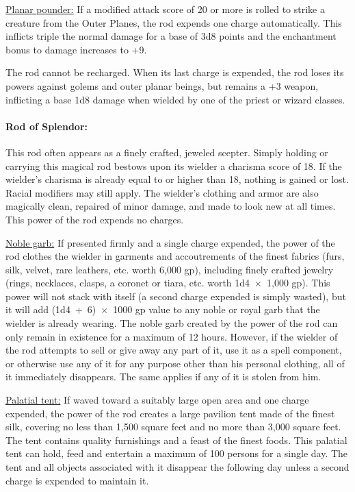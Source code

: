 \begin{multicols}{2}
\underline{Planar pounder:} If a modified attack score of 20 or more is rolled to strike a creature from the Outer Planes, the rod expends one charge automatically.  This inflicts triple the normal damage for a base of 3d8 points and the enchantment bonus to damage increases to +9.

The rod cannot be recharged.  When its last charge is expended, the rod loses its powers against golems and outer planar beings, but remains a +3 weapon, inflicting a base 1d8 damage when wielded by one of the priest or wizard classes.

\paragraph{Rod of Splendor:} This rod often appears as a finely crafted, jeweled scepter.  Simply holding or carrying this magical rod bestows upon its wielder a charisma score of 18.  If the wielder's charisma is already equal to or higher than 18, nothing is gained or lost.  Racial modifiers may still apply.  The wielder's clothing and armor are also magically clean, repaired of minor damage, and made to look new at all times.  This power of the rod expends no charges.  

\underline{Noble garb:} If presented firmly and a single charge expended, the power of the rod clothes the wielder in garments and accoutrements of the finest fabrics (furs, silk, velvet, rare leathers, etc. worth 6,000 gp), including finely crafted jewelry (rings, necklaces, clasps, a coronet or tiara, etc. worth 1d4~$\times$~1,000 gp).  This power will not stack with itself (a second charge expended is simply wasted), but it will add (1d4~+~6)~$\times$~1000 gp value to any noble or royal garb that the wielder is already wearing.  The noble garb created by the power of the rod can only remain in existence for a maximum of 12 hours.  However, if the wielder of the rod attempts to sell or give away any part of it, use it as a spell component, or otherwise use any of it for any purpose other than his personal clothing, all of it immediately disappears.  The same applies if any of it is stolen from him.

\underline{Palatial tent:} If waved toward a suitably large open area and one charge expended, the power of the rod creates a large pavilion tent made of the finest silk, covering no less than 1,500 square feet and no more than 3,000 square feet.  The tent contains quality furnishings and a feast of the finest foods.  This palatial tent can hold, feed and entertain a maximum of 100 persons for a single day.  The tent and all objects associated with it disappear the following day unless a second charge is expended to maintain it.


\end{multicols}
